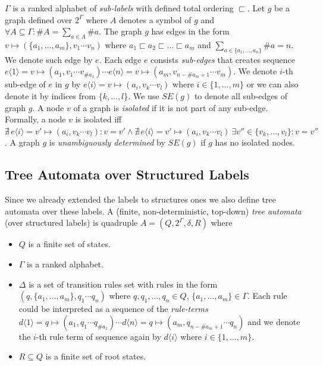 $\Gamma$ is a ranked alphabet of \emph{sub-labels} with defined total ordering $\sqsubset$.
Let $g$ be a graph defined over $2^\Gamma$ where $A$ denotes a symbol of $g$ and $\forall A \subseteq \Gamma: \#A = \sum_{a\in A} \#a$.
The graph $g$ has edges in the form $v \mapsto (\{a_1,\ldots,a_m\},v_1 \cdots v_n)$ where
$a_1 \sqsubset a_2 \sqsubset \ldots \sqsubset a_m$ and $\sum_{a \in \{a_1,\ldots,a_n\}} \# a = n$.
We denote such edge by $e$.
Each edge $e$ consists \emph{sub-edges} that creates sequence $e\langle 1\rangle = v \mapsto (a_1,v_1 \cdots v_{\#a_1}) \cdots e\langle n\rangle= v \mapsto (a_m,v_{n-\#a_m+1} \cdots v_m)$.
We denote $i$-th sub-edge of $e$ in $g$ by $e\langle i\rangle = v \mapsto (a_i,v_k \cdots v_l)$ where $i \in \{1,\ldots,m\}$ or
we can also denote it by indices from $\{k,\ldots,l\}$.
We use $SE(g)$ to denote all sub-edges of graph $g$.
A node $v$ of a graph is \emph{isolated} if it is not part of any sub-edge.
Formally, a node $v$ is isolated iff $\nexists\, e\langle i\rangle = v' \mapsto (a_i,v_k \cdots v_l): v = v' \wedge \nexists\, e\langle i\rangle = v' \mapsto (a_i,v_k \cdots v_l)\ \exists v'' \in \{v_k,\ldots, v_l\}: v = v''$.
A graph $g$ is \emph{unambiguously determined} by $SE(g)$ if $g$ has no isolated nodes.

\subsection{Tree Automata over Structured Labels}

Since we already extended the labels to structures ones we also define tree automata over these labels.
A (finite, non-deterministic, top-down) \emph{tree automata} (over structured labels) is quadruple $A=(Q,2^\Gamma, \delta, R)$ where
\begin{itemize}
	\item $Q$ is a finite set of states.
	\item $\Gamma$ is a ranked alphabet.
	\item $\Delta$ is a set of transition rules set with rules in the form $(q,\{a_1,\ldots,a_m\},q_1 \cdots q_n)$ where $q,q_1,\ldots,q_n \in Q$, $\{a_1,\ldots,a_m\} \in \Gamma$.
	Each rule could be interpreted as a sequence of the \emph{rule-terms} $d\langle 1\rangle = q \mapsto (a_1,q_1 \cdots q_{\#a_1}) \cdots d\langle n\rangle= q \mapsto (a_m,q_{n-\#a_m+1} \cdots q_n)$ and
	we denote the $i$-th rule term of sequence again by $d\langle i\rangle$ where $i \in \{1,\ldots,m\}$.
	\item $R\subseteq Q$ is a finite set of root states.
\end{itemize}

